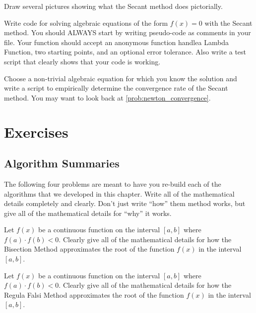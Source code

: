 \begin{problem}
    Draw several pictures showing what the Secant method does pictorially.
\end{problem}

\begin{problem}
    Write \ProgLang code for solving algebraic equations of the form $f(x) = 0$ with the
    Secant method.  You should ALWAYS start by writing pseudo-code as comments in your
    \ProgLang file.   Your function should accept \ifnum{} an anonymous function
    handle\else a Lambda Function\fi, two starting
    points, and an optional error tolerance.  Also write a test script that clearly shows that your code is working.
    \\
    \ifnum{}
    \else
    \fi
\end{problem}

\begin{problem}
    Choose a non-trivial algebraic equation for which you know the solution and write a
    script to empirically determine the convergence rate of the Secant method.  You may want to
    look back at \ref{prob:newton_convergence}.
\end{problem}





\newpage\section{Exercises}

\subsection{Algorithm Summaries}
The following four problems are meant to have you re-build each of the algorithms that
we developed in this chapter.  Write all of the mathematical details completely and
clearly.  Don't just write ``how'' them method works, but give all of the mathematical
details for ``why'' it works.
\begin{problem}
    Let $f(x)$ be a continuous function on the interval $[a,b]$ where $f(a) \cdot f(b) <
    0$.  Clearly give all of the mathematical details for how the Bisection Method
    approximates the root of the function $f(x)$ in the interval $[a,b]$.  
\end{problem}

\begin{problem}
    Let $f(x)$ be a continuous function on the interval $[a,b]$ where $f(a) \cdot f(b) <
    0$.  Clearly give all of the mathematical details for how the Regula Falsi Method
    approximates the root of the function $f(x)$ in the interval $[a,b]$. 
\end{problem}

